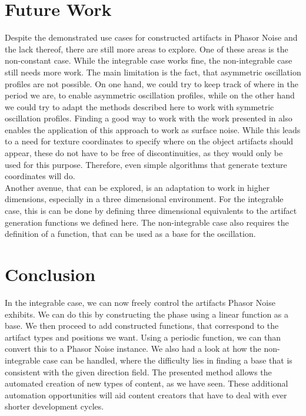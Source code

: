 \documentclass{utue} %
\begin{document}
  
\section{Future Work}
Despite the demonstrated use cases for constructed artifacts in Phasor Noise and the lack thereof, there are still more areas to explore. One of these areas is the non-constant case. While the integrable case works fine, the non-integrable case still needs more work. The main limitation is the fact, that asymmetric oscillation profiles are not possible. On one hand, we could try to keep track of where in the period we are, to enable asymmetric oscillation profiles, while on the other hand we could try to adapt the methods described here to work with symmetric oscillation profiles. Finding a good way to work with the work presented in \cite{stripes} also enables the application of this approach to work as surface noise. While this leads to a need for texture coordinates to specify where on the object artifacts should appear, these do not have to be free of discontinuities, as they would only be used for this purpose. Therefore, even simple algorithms that generate texture coordinates will do.\\
Another avenue, that can be explored, is an adaptation to work in higher dimensions, especially in a three dimensional environment. For the integrable case, this is can be done by defining three dimensional equivalents to the artifact generation functions we defined here. The non-integrable case also requires the definition of a function, that can be used as a base for the oscillation.

\section{Conclusion}
In the integrable case, we can now freely control the artifacts Phasor Noise exhibits. We can do this by constructing the phase using a linear function as a base. We then proceed to add constructed functions, that correspond to the artifact types and positions we want. Using a periodic function, we can than convert this to a Phasor Noise instance. We also had a look at how the non-integrable case can be handled, where the difficulty lies in finding a base that is consistent with the given direction field. The presented method allows the automated creation of new types of content, as we have seen. These additional automation opportunities will aid content creators that have to deal with ever shorter development cycles.


\FloatBarrier
\printbibliography
\end{document}
